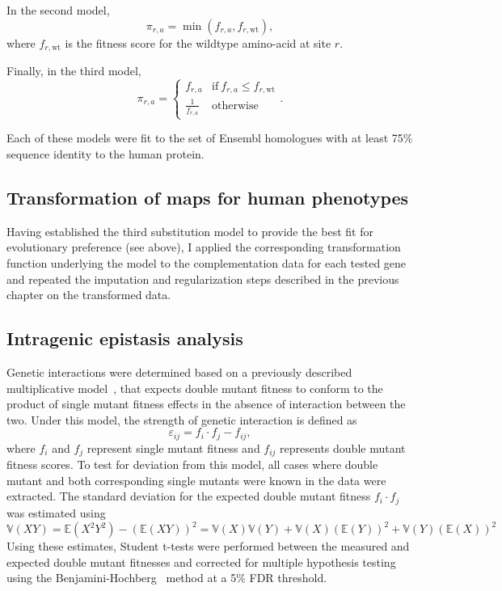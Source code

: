 In the second model, $$\pi_{r,a} = \min(f_{r,a}, f_{r,\text{wt}}),$$ where $f_{r,\text{wt}}$ is the fitness score for the wildtype amino-acid at site $r$. 

Finally, in the third model, $$\pi_{r,a} = \begin{cases} f_{r,a} &  \text{if}~ f_{r,a} \le f_{r,\text{wt}} \\ \frac{1}{f_{r,a}} & \text{otherwise} \end{cases}. $$ 

Each of these models were fit to the set of Ensembl homologues with at least 75\% sequence identity to the human protein. 

\subsection{Transformation of maps for human phenotypes}
Having established the third substitution model to provide the best fit for evolutionary preference (see above), I applied the corresponding transformation function underlying the model to the complementation data for each tested gene and repeated the imputation and regularization steps described in the previous chapter on the transformed data.

\subsection{Intragenic epistasis analysis} Genetic interactions were determined based on a previously described multiplicative model~\cite{phillips_language_1998,onge_systematic_2007}, that expects double mutant fitness to conform to the product of single mutant fitness effects in the absence of interaction between the two. Under this model, the strength of genetic interaction is defined as $$\varepsilon_{ij} = f_i \cdot f_j - f_{ij},$$ where $f_i$ and $f_j$ represent single mutant fitness and $f_{ij}$ represents double mutant fitness scores. To test for deviation from this model, all cases where double mutant and both corresponding single mutants were known in the data were extracted. The standard deviation for the expected double mutant fitness $f_i \cdot f_j$ was estimated using
$$ \mathbb{V}(XY) = \mathbb{E}(X^2Y^2)-(\mathbb{E}(XY))^2=\mathbb{V}(X)\mathbb{V}(Y) + \mathbb{V}(X)(\mathbb{E}(Y))^2+\mathbb{V}(Y)(\mathbb{E}(X))^2 $$ 
Using these estimates, Student t-tests were performed between the measured and expected double mutant fitnesses and corrected for multiple hypothesis testing using the  Benjamini-Hochberg~\cite{benjamini_controlling_1995} method at a 5\% FDR threshold.

